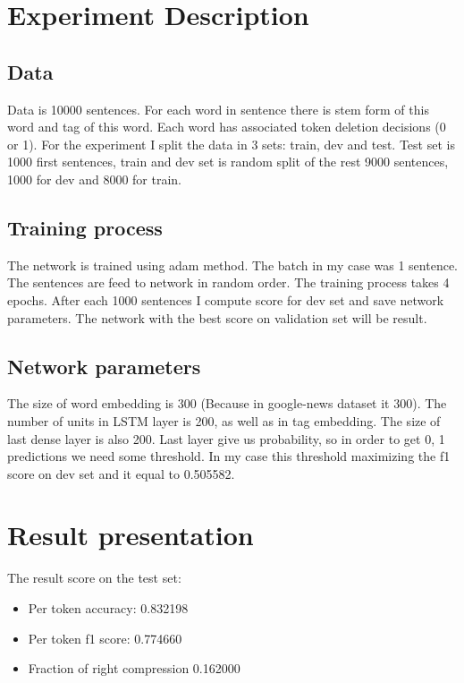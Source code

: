 \documentclass[a4paper,12pt,oneside]{article}
\begin{document}
\section{Experiment Description}

\subsection{Data}
Data is 10000 sentences. For each word in sentence there is stem form of this word and tag of this word. Each word has associated token deletion decisions (0 or 1). For the experiment I split the data in 3 sets: train, dev and test. Test set is 1000 first sentences, train and dev set is random split of the rest 9000 sentences, 1000 for dev and 8000 for train.


\subsection{Training process}
The network is trained using adam method. The batch in my case was 1 sentence. The sentences are feed to network in random order. The training process takes 4 epochs. After each 1000 sentences I compute score for dev set and save network parameters. The network with the best score on validation set will be result. 

\subsection{Network parameters}
The size of word embedding is 300 (Because in google-news dataset it 300). The number of units in LSTM layer is 200, as well as in tag embedding. The size of last dense layer is also 200. Last layer give us probability, so in order to get 0, 1 predictions we need some threshold. In my case this threshold maximizing the f1 score on dev set and it equal to 0.505582.

\section{Result presentation}
The result score on the test set:

\begin{itemize}
  \item Per token accuracy: 0.832198
  \item Per token f1 score: 0.774660
  \item Fraction of right compression 0.162000
\end{itemize}
\end{document}
